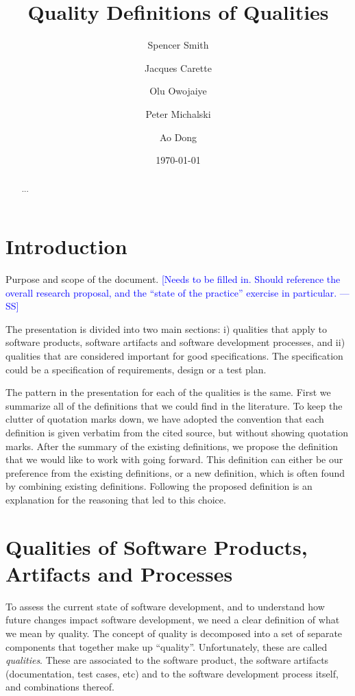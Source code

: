 \documentclass[letterpaper,cleveref]{lipics-v2019}
\title{Quality Definitions of Qualities}
\author{Spencer Smith}{McMaster University, Canada}{smiths@mcmaster.ca}{}{}
\author{Jacques Carette}{McMaster University, Canada}{carette@mcmaster.ca}{}{}
\author{Olu Owojaiye}{McMaster University, Canada}{owojaiyo@mcmaster.ca}{}{}
\author{Peter Michalski}{McMaster University, Canada}{michap@mcmaster.ca}{}{}
\author{Ao Dong}{McMaster University, Canada}{}{}{}
\date{\today}
\newcommand{\authornote}[3]{\textcolor{#1}{[#3 ---#2]}}
\newcommand{\authornote}[3]{}
\newcommand{\wss}[1]{\authornote{blue}{SS}{#1}} %
\theoremstyle{definition}
\begin{document}
\maketitle

\begin{abstract}
  ...
\end{abstract}

\tableofcontents

\section{Introduction} \label{SecIntroduction}

Purpose and scope of the document.  \wss{Needs to be filled in.  Should
  reference the overall research proposal, and the ``state of the practice''
  exercise in particular.}

The presentation is divided into two main sections: i) qualities that apply to
software products, software artifacts and software development processes, and
ii) qualities that are considered important for good specifications.  The
specification could be a specification of requirements, design or a test plan.

The pattern in the presentation for each of the qualities is the same.  First we
summarize all of the definitions that we could find in the literature.  To keep
the clutter of quotation marks down, we have adopted the convention that each
definition is given verbatim from the cited source, but without showing
quotation marks.  After the summary of the existing definitions, we propose the
definition that we would like to work with going forward.  This definition can
either be our preference from the existing definitions, or a new definition,
which is often found by combining existing definitions.  Following the proposed
definition is an explanation for the reasoning that led to this choice.

\section{Qualities of Software Products, Artifacts and
  Processes} \label{SecQualities}

To assess the current state of software development, and to understand how
future changes impact software development, we need a clear definition of what
we mean by quality.  The concept of quality is decomposed into a set of separate
components that together make up ``quality''. Unfortunately, these are
called \emph{qualities}. These are associated to the software product,
the software artifacts (documentation, test cases, etc) and to the software
development process itself, and combinations thereof.
\end{document}

